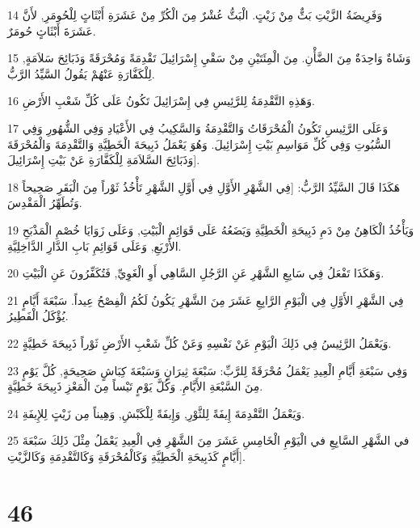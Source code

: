 \par 14 وَفَرِيضَةُ الزَّيْتِ بَثٌّ مِنْ زَيْتٍ. الْبَثُّ عُشْرٌ مِنَ الْكُرِّ مِنْ عَشَرَةِ أَبْثَاثٍ لِلْحُومَرِ, لأَنَّ عَشَرَةَ أَبْثَاثٍ حُومَرٌ.
\par 15 وَشَاةٌ وَاحِدَةٌ مِنَ الضَّأْنِ. مِنَ الْمِئَتَيْنِ مِنْ سَقْيِ إِسْرَائِيلَ تَقْدِمَةً وَمُحْرَقَةً وَذَبَائِحَ سَلاَمَةٍ, لِلْكَفَّارَةِ عَنْهُمْ يَقُولُ السَّيِّدُ الرَّبُّ.
\par 16 وَهَذِهِ التَّقْدِمَةُ لِلرَّئِيسِ فِي إِسْرَائِيلَ تَكُونُ عَلَى كُلِّ شَعْبِ الأَرْضِ.
\par 17 وَعَلَى الرَّئِيسِ تَكُونُ الْمُحْرَقَاتُ وَالتَّقْدِمَةُ وَالسَّكِيبُ فِي الأَعْيَادِ وَفِي الشُّهُورِ وَفِي السُّبُوتِ وَفِي كُلِّ مَوَاسِمِ بَيْتِ إِسْرَائِيلَ. وَهُوَ يَعْمَلُ ذَبِيحَةَ الْخَطِيَّةِ وَالتَّقْدِمَةَ وَالْمُحْرَقَةَ وَذَبَائِحَ السَّلاَمَةِ لِلْكَفَّارَةِ عَنْ بَيْتِ إِسْرَائِيلَ].
\par 18 هَكَذَا قَالَ السَّيِّدُ الرَّبُّ: [فِي الشَّهْرِ الأَوَّلِ فِي أَوَّلِ الشَّهْرِ تَأْخُذُ ثَوْراً مِنَ الْبَقَرِ صَحِيحاً وَتُطَهِّرُ الْمَقْدِسَ.
\par 19 وَيَأْخُذُ الْكَاهِنُ مِنْ دَمِ ذَبِيحَةِ الْخَطِيَّةِ وَيَضَعُهُ عَلَى قَوَائِمِ الْبَيْتِ, وَعَلَى زَوَايَا خُصْمِ الْمَذْبَحِ الأَرْبَعِ, وَعَلَى قَوَائِمِ بَابِ الدَّارِ الدَّاخِلِيَّةِ.
\par 20 وَهَكَذَا تَفْعَلُ فِي سَابِعِ الشَّهْرِ عَنِ الرَّجُلِ السَّاهِي أَوِ الْغَوِيِّ, فَتُكَفِّرُونَ عَنِ الْبَيْتِ.
\par 21 فِي الشَّهْرِ الأَوَّلِ فِي الْيَوْمِ الرَّابِعِ عَشَرَ مِنَ الشَّهْرِ يَكُونُ لَكُمُ الْفِصْحُ عِيداً. سَبْعَةَ أَيَّامٍ يُؤْكَلُ الْفَطِيرُ.
\par 22 وَيَعْمَلُ الرَّئِيسُ فِي ذَلِكَ الْيَوْمِ عَنْ نَفْسِهِ وَعَنْ كُلِّ شَعْبِ الأَرْضِ ثَوْراً ذَبِيحَةَ خَطِيَّةٍ.
\par 23 وَفِي سَبْعَةِ أَيَّامِ الْعِيدِ يَعْمَلُ مُحْرَقَةً لِلرَّبِّ: سَبْعَةَ ثِيرَانٍ وَسَبْعَةَ كِبَاشٍ صَحِيحَةٍ, كُلَّ يَوْمٍ مِنَ السَّبْعَةِ الأَيَّامِ. وَكُلَّ يَوْمٍ تَيْساً مِنَ الْمَعْزِ ذَبِيحَةَ خَطِيَّةٍ.
\par 24 وَيَعْمَلُ التَّقْدِمَةَ إِيفَةً لِلثَّوْرِ, وَإِيفَةً لِلْكَبْشِ, وَهِيناً مِن زَيْتٍ لِلإِيفَةِ.
\par 25 في الشَّهْرِ السَّابِعِ في الْيَوْمِ الْخَامِسِ عَشَرَ مِنَ الشَّهْرِ فِي الْعِيدِ يَعْمَلُ مِثْلَ ذَلِكَ سَبْعَةَ أَيَّامٍ كَذَبِيحَةِ الْخَطِيَّةِ وَكَالْمُحْرَقَةِ وَكَالتَّقْدِمَةِ وَكَالزَّيْتِ].

\chapter{46}


